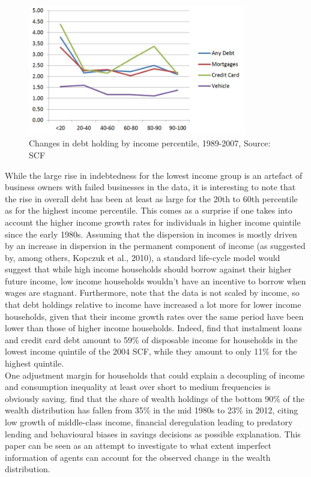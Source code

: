 \begin{figure}[ht]
	\centering
		\includegraphics[width=0.85\textwidth]{chg_debt_scf}
		\caption{Changes in debt holding by income percentile, 1989-2007, Source: SCF}
	\label{fig:chg_debt_scf}
\end{figure}

While the large rise in indebtedness for the lowest income group is an artefact 
of business owners with failed businesses in the data, it is interesting to note 
that the rise in overall debt has been at least as large for the 20th to 60th 
percentile as for the highest income percentile. This comes as a surprise if one 
takes into account the higher income growth rates for individuals in higher 
income quintile since the early 1980s. Assuming that the dispersion in incomes 
is mostly driven by an increase in dispersion in the permanent component of income 
(as suggested by, among others, Kopczuk et al., 2010), a standard life-cycle model 
would suggest that while high income households should borrow against their higher 
future income, low income households wouldn't have an incentive to borrow when 
wages are stagnant. Furthermore, note that the data is not scaled by income, so 
that debt holdings relative to income have increased a lot more for lower income 
households, given that their income growth rates over the same period have been 
lower than those of higher income households. Indeed, \citet{BarbaPivetti2009} 
find that instalment loans and credit card debt amount to 59\% of disposable income 
for households in the lowest income quintile of the 2004 SCF, while they amount 
to only 11\% for the highest quintile. \\
One adjustment margin for households that could explain a decoupling of income 
and consumption inequality at least over short to medium frequencies is obviously 
saving. \citet{SaezZucman2014} find that the share of wealth holdings of the bottom 
90\% of the wealth distribution has fallen from 35\% in the mid 1980s to 23\% in 
2012, citing low growth of middle-class income, financial deregulation leading to 
predatory lending and behavioural biases in savings decisions as possible explanation. 
This paper can be seen as an attempt to investigate to what extent imperfect 
information of agents can account for the observed change in the wealth distribution.  

